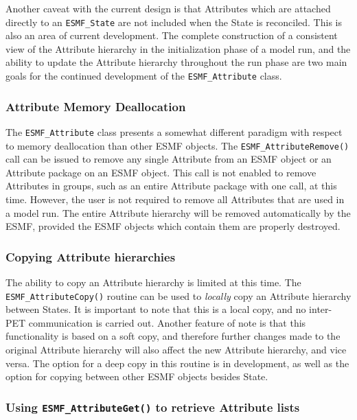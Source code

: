 Another caveat with the current design is that Attributes which are attached directly to an {\tt ESMF\_State} are not included when the State is reconciled.  This is also an area of current development.  The complete construction of a consistent view of the Attribute hierarchy in the initialization phase of a model run, and the ability to update the Attribute hierarchy throughout the run phase are two main goals for the continued development of the {\tt ESMF\_Attribute} class.

\subsubsection{Attribute Memory Deallocation}

The {\tt ESMF\_Attribute} class presents a somewhat different paradigm with respect to memory deallocation than other ESMF objects.  The {\tt ESMF\_AttributeRemove()} call can be issued to remove any single Attribute from an ESMF object or an Attribute package on an ESMF object.  This call is not enabled to remove Attributes in groups, such as an entire Attribute package with one call, at this time.  However, the user is not required to remove all Attributes that are used in a model run.  The entire Attribute hierarchy will be removed automatically by the ESMF, provided the ESMF objects which contain them are properly destroyed.  

\subsubsection{Copying Attribute hierarchies}

The ability to copy an Attribute hierarchy is limited at this time.  The {\tt ESMF\_AttributeCopy()} routine can be used to {\it locally} copy an Attribute hierarchy between States.  It is important to note that this is a local copy, and no inter-PET communication is carried out.  Another feature of note is that this functionality is based on a soft copy, and therefore further changes made to the original Attribute hierarchy will also affect the new Attribute hierarchy, and vice versa.  The option for a deep copy in this routine is in development, as well as the option for copying between other ESMF objects besides State.  

\subsubsection{Using {\tt ESMF\_AttributeGet()} to retrieve Attribute lists}

